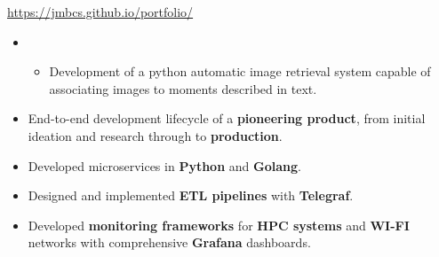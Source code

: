 \documentclass[10pt,a4paper,ragged2e,withhyper]{altacv}
\begin{document}
\begin{paracol}{2}


      \url{https://jmbcs.github.io/portfolio/}



      \begin{itemize}
            \item[]
                  \begin{itemize}
                        \item Development of a python automatic image retrieval system capable of associating
                              images to moments described in text.
                  \end{itemize}
      \end{itemize}



      \begin{itemize}  
            \item End-to-end development lifecycle of a \textcolor{heading}{\textbf{pioneering product}}, from initial ideation and research through to \textcolor{heading}{\textbf{production}}.
            
            \item Developed microservices in  \textcolor{heading}{\textbf{Python}} and \textcolor{heading}{\textbf{Golang}}.

            \item Designed and implemented \textcolor{heading}{\textbf{ETL pipelines}} with \textcolor{heading}{\textbf{Telegraf}}.          
            
            \item Developed \textcolor{heading}{\textbf{monitoring frameworks}} for \textcolor{heading}{\textbf{HPC systems}} and \textcolor{heading}{\textbf{WI-FI}} networks with comprehensive \textcolor{heading}{\textbf{Grafana}} dashboards.


\end{itemize}
\end{paracol}
\end{document}
